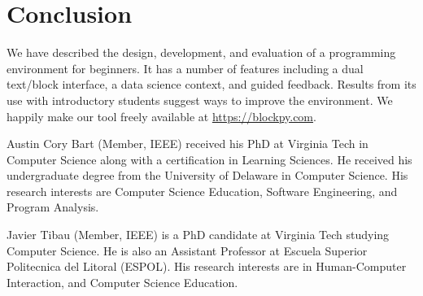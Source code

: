 \documentclass[10pt,journal,compsoc]{IEEEtran}
\begin{document}
\section{Conclusion}

We have described the design, development, and evaluation of a programming environment for beginners.
It has a number of features including a dual text/block interface, a data science context, and guided feedback.
Results from its use with introductory students suggest ways to improve the environment.
We happily make our tool freely available at \url{https://blockpy.com}.




\begin{IEEEbiography}{Austin Cory Bart} (Member, IEEE) received his PhD at Virginia Tech in Computer Science along with a certification in Learning Sciences. He received his undergraduate degree from the University of Delaware in Computer Science. His research interests are Computer Science Education, Software Engineering, and Program Analysis.
\end{IEEEbiography}

\begin{IEEEbiography}{Javier Tibau} (Member, IEEE) is a PhD candidate at Virginia Tech studying Computer Science. He is also an Assistant Professor at Escuela Superior Politecnica del Litoral (ESPOL). His research interests are in Human-Computer Interaction, and Computer Science Education.
\end{IEEEbiography}
\end{document}
